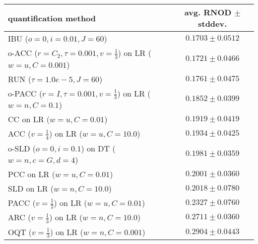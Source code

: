 \begin{tabular}{lc}
  \toprule
  quantification method & avg. RNOD $\pm$ stddev. \\
  \midrule
  IBU ($o=0, i=0.01, J=60$) & $\mathbf{0.1703 \pm 0.0512}$ \\
  o-ACC ($r=C_2, \tau=0.001, v=\frac{1}{3}$) on LR ($w=u, C=0.001$) & $\mathbf{0.1721 \pm 0.0466}$ \\
  RUN ($\tau=1.0e-5, J=60$) & $0.1761 \pm 0.0475$ \\
  o-PACC ($r=I, \tau=0.001, v=\frac{1}{3}$) on LR ($w=n, C=0.1$) & $0.1852 \pm 0.0399$ \\
  CC on LR ($w=u, C=0.01$) & $0.1919 \pm 0.0419$ \\
  ACC ($v=\frac{1}{4}$) on LR ($w=u, C=10.0$) & $0.1934 \pm 0.0425$ \\
  o-SLD ($o=0, i=0.1$) on DT ($w=n, c=G, d=4$) & $0.1981 \pm 0.0359$ \\
  PCC on LR ($w=u, C=0.01$) & $0.2001 \pm 0.0360$ \\
  SLD on LR ($w=n, C=10.0$) & $0.2018 \pm 0.0780$ \\
  PACC ($v=\frac{1}{2}$) on LR ($w=u, C=0.01$) & $0.2327 \pm 0.0760$ \\
  ARC ($v=\frac{1}{3}$) on LR ($w=n, C=10.0$) & $0.2711 \pm 0.0360$ \\
  OQT ($v=\frac{1}{3}$) on LR ($w=n, C=0.001$) & $0.2904 \pm 0.0443$ \\
  \bottomrule
\end{tabular}

